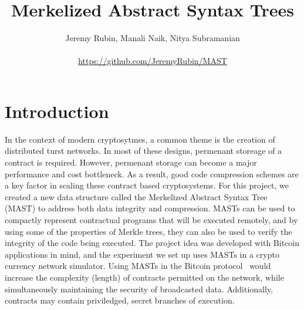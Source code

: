 \documentclass{vldb}
\begin{document}



\title{Merkelized Abstract Syntax Trees}




\author{
\alignauthor Jeremy Rubin, Manali Naik, Nitya Subramanian\\
\vspace{.2cm}
        \\
       \url{https://github.com/JeremyRubin/MAST}}

\maketitle

\section{Introduction}

In the context of modern cryptosytmes, a common theme is the creation of
distributed turst networks. In most of these designs, permenant storeage of a
contract is required. However, permenant storage can become a major performance
and cost bottleneck. As a result, good code compression schemes are a key
factor in scaling these contract based cryptosystems. For this project, we
created a new data structure called the Merkelized Abstract Syntax Tree (MAST)
to address both data integrity and compression. MASTs can be used to compactly
represent contractual programs that will be executed remotely, and by using
some of the properties of Merkle trees, they can also be used to verify the
integrity of the code being executed. The project idea was developed with
Bitcoin applications in mind, and the experiment we set up uses MASTs in a
crypto currency network simulator. Using MASTs in the Bitcoin
protocol~\cite{bitcoin} would increase the complexity (length) of contracts
permitted on the network, while simultaneously maintaining the security of
broadcasted data. Additionally, contracts may contain priviledged, secret
branches of execution.
\end{document}
